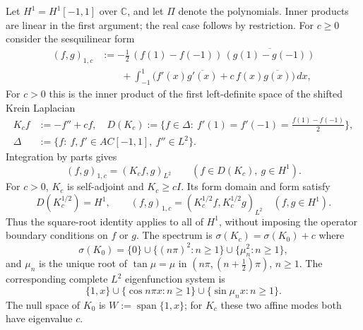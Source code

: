 ﻿\documentclass[11pt]{article}
\begin{document}
Let $H^1=H^1[-1,1]$ over $\mathbb C$, and let $\Pi$ denote the polynomials.
Inner products are linear in the first argument; the real case follows by
restriction.  For $c\ge 0$ consider the sesquilinear form \cite[eq.~(2)]{axioms}
\begin{equation}
	\begin{aligned}
		(f,g)_{1,c}&:=-\tfrac12\,(f(1)-f(-1))\,\overline{(g(1)-g(-1))}\\
		&\qquad+\int_{-1}^1\bigl(f'(x)\overline{g'(x)}+c\,f(x)\overline{g(x)}\bigr)\,dx,
	\end{aligned}
	\label{eq:ld}
\end{equation}
For $c>0$ this is the inner product of the first left-definite space of the
shifted Krein Laplacian \cite[eqs.~(3)--(4)]{axioms}
\begin{equation*}
	\begin{aligned}
		K_c f&:=-f''+cf,\quad D(K_c):=\bigl\{f\in\Delta:\ f'(1)=f'(-1)=\tfrac{f(1)-f(-1)}2\bigr\},\\
		\Delta&:=\{f:\ f,f'\in AC[-1,1],\ f''\in L^2\}.
	\end{aligned}
\end{equation*}
Integration by parts gives
\begin{equation*}
	(f,g)_{1,c}=(K_c f,g)_{L^2}
	\qquad(f\in D(K_c),\ g\in H^1).
\end{equation*}
For $c>0$, $K_c$ is self-adjoint and $K_c\ge cI$.  Its form domain and
form satisfy \cite[Theorem~1 and the following paragraph]{axioms}
\begin{equation}
	D(K_c^{1/2})=H^1,\qquad
	(f,g)_{1,c}=(K_c^{1/2}f,K_c^{1/2}g)_{L^2}
	\quad(f,g\in H^1).
	\label{eq:form-domain}
\end{equation}
Thus the square-root identity applies to all of $H^1$, without imposing
the operator boundary conditions on $f$ or $g$.
The spectrum is $\sigma(K_c)=\sigma(K_0)+c$ where
\cite[eqs.~(7)--(8)]{axioms}
\begin{equation*}
	\sigma(K_0)=\{0\}\cup\{(n\pi)^2:n\ge 1\}\cup\{\mu_n^2:n\ge 1\},
\end{equation*}
and $\mu_n$ is the unique root of $\tan\mu=\mu$ in
$(n\pi,(n+\tfrac12)\pi)$, $n\ge1$.  The corresponding complete
$L^2$ eigenfunction system is
\begin{equation*}
	\{1,x\}\cup\{\cos n\pi x:n\ge1\}\cup\{\sin\mu_n x:n\ge1\}.
\end{equation*}
The null space of $K_0$ is $W:=\operatorname{span}\{1,x\}$; for $K_c$ these
two affine modes both have eigenvalue $c$.
\end{document}
